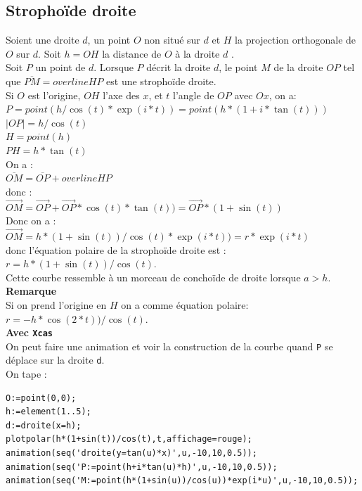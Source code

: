 \documentclass[a4paper,11pt]{book}
\begin{document}
\subsection{Stropho\"{i}de droite}
Soient une droite $d$, un point $O$ non situ\'e sur $d$ et $H$ la projection 
orthogonale de $O$ sur $d$.
Soit $h=OH$ la distance de $O$ \`a la droite $d$ .\\
Soit $P$ un point de $d$.
Lorsque $P$ d\'ecrit la droite $d$, le point $M$ de la droite $OP$  tel que 
 $\overline{PM}=overline{HP}$  est 
une stropho\"{i}de droite.\\
Si $O$ est l'origine, $OH$ l'axe des $x$, et $t$ l'angle de $OP$ avec $Ox$,
on a:\\
$P=point(h/\cos(t)*\exp(i*t))=point(h*(1+i*\tan(t)))$ \\
$|OP|=h/\cos(t)$\\
$H=point(h)$\\
$PH=h*\tan(t)$\\
On a :\\
$\overline{OM}=\overline{OP}+overline{HP}$\\
donc :\\
$\overrightarrow{OM}=\overrightarrow{OP}+\overrightarrow{OP}*\cos(t)*\tan(t))=\overrightarrow{OP}*(1+\sin(t))$\\
Donc  on a :\\
$\overrightarrow{OM}=h*(1+\sin(t))/\cos(t)*\exp(i*t))=r*\exp(i*t)$\\
donc l'\'equation polaire de la stropho\"ide droite est :\\
$r=h*(1+\sin(t))/\cos(t)$.\\
Cette courbe ressemble \`a un morceau de concho\"ide de droite lorsque $a>h$.
{\bf Remarque}\\
Si on prend l'origine en $H$ on a comme \'equation polaire:\\
$r=-h*\cos(2*t))/\cos(t)$.\\
 
{\bf Avec {\tt Xcas}}\\
On peut faire une animation et voir la construction de la courbe quand 
{\tt P} se d\'eplace sur la droite {\tt d}.\\
On tape :
\begin{verbatim}
O:=point(0,0);
h:=element(1..5);
d:=droite(x=h);
plotpolar(h*(1+sin(t))/cos(t),t,affichage=rouge);
animation(seq('droite(y=tan(u)*x)',u,-10,10,0.5));
animation(seq('P:=point(h+i*tan(u)*h)',u,-10,10,0.5));
animation(seq('M:=point(h*(1+sin(u))/cos(u))*exp(i*u)',u,-10,10,0.5));
\end{verbatim}
\end{document}
